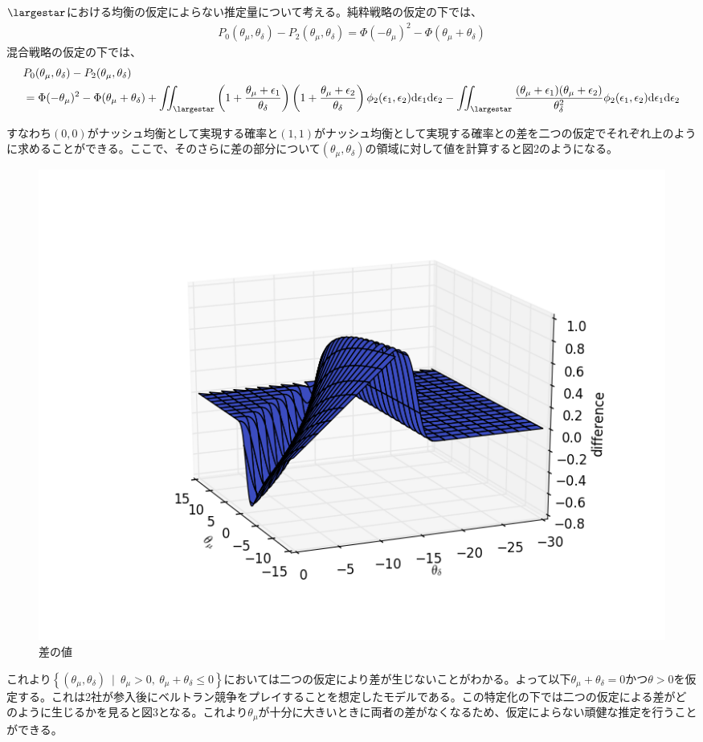 \documentclass{jsarticle}
\begin{document}
$\largestar$における均衡の仮定によらない推定量について考える。純粋戦略の仮定の下では、
\begin{align*}
P_0(\theta_{\mu}, \theta_{\delta}) - P_2(\theta_{\mu}, \theta_{\delta}) = \Phi(-\theta_{\mu})^2 - \Phi(\theta_{\mu} + \theta_{\delta})
\end{align*}
混合戦略の仮定の下では、
\begin{align*}
&P_0(\theta_{\mu}, \theta_{\delta}) - P_2(\theta_{\mu}, \theta_{\delta}) \\
&= \Phi(-\theta_{\mu})^2 - \Phi(\theta_{\mu} + \theta_{\delta}) +  \iint_{\largestar} \left( 1 + \frac{\theta_{\mu} + \epsilon_1}{\theta_{\delta}} \right) \left( 1 + \frac{\theta_{\mu} + \epsilon_2}{\theta_{\delta}} \right) \phi_2(\epsilon_1, \epsilon_2) \mathrm{d}\epsilon_1 \mathrm{d}\epsilon_2 - \iint_{\largestar} \frac{(\theta_{\mu}+\epsilon_1)(\theta_{\mu} + \epsilon_2)}{\theta_{\delta}^2} \phi_2(\epsilon_1, \epsilon_2) \mathrm{d}\epsilon_1 \mathrm{d}\epsilon_2
\end{align*}

すなわち$(0,0)$がナッシュ均衡として実現する確率と$(1,1)$がナッシュ均衡として実現する確率との差を二つの仮定でそれぞれ上のように求めることができる。ここで、そのさらに差の部分について$(\theta_{\mu}, \theta_{\delta})$の領域に対して値を計算すると図2のようになる。
\begin{figure}[htbp]
\centering
\includegraphics{diff.png}
\caption{差の値}
\end{figure}

これより$\left\{ (\theta_{\mu}, \theta_{\delta})\ \mid\ \theta_{\mu} > 0,\ \theta_{\mu} + \theta_{\delta} \leq 0\right\}$においては二つの仮定により差が生じないことがわかる。よって以下$\theta_{\mu} + \theta_{\delta} = 0$かつ$\theta > 0$を仮定する。これは2社が参入後にベルトラン競争をプレイすることを想定したモデルである。この特定化の下では二つの仮定による差がどのように生じるかを見ると図3となる。これより$\theta_{\mu}$が十分に大きいときに両者の差がなくなるため、仮定によらない頑健な推定を行うことができる。
\end{document}
